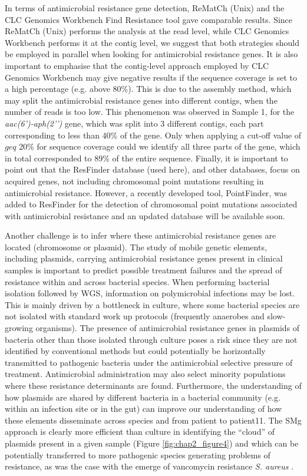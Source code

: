 In terms of antimicrobial resistance gene detection, ReMatCh (Unix) and the CLC Genomics Workbench Find Resistance tool gave comparable results. Since ReMatCh (Unix) performs the analysis at the read level, while CLC Genomics Workbench performs it at the contig level, we suggest that both strategies should be employed in parallel when looking for antimicrobial resistance genes. It is also important to emphasise that the contig-level approach employed by CLC Genomics Workbench may give negative results if the sequence coverage is set to a high percentage (e.g. above 80\%). This is due to the assembly method, which may split the antimicrobial resistance genes into different contigs, when the number of reads is too low. This phenomenon was observed in Sample 1, for the \textit{aac(6’)-aph(2’’)} gene, which was split into 3 different contigs, each part corresponding to less than 40\% of the gene. Only when applying a cut-off value of $geq$ 20\% for sequence coverage could we identify all three parts of the gene, which in total corresponded to 89\% of the entire sequence. Finally, it is important to point out that the ResFinder database (used here), and other databases, focus on acquired genes, not including chromosomal point mutations resulting in antimicrobial resistance. However, a recently developed tool, PointFinder, was added to ResFinder for the detection of chromosomal point mutations associated with antimicrobial resistance \citep{zankari_pointfinder_2017} and an updated database will be available soon.

Another challenge is to infer where these antimicrobial resistance genes are located (chromosome or plasmid). The study of mobile genetic elements, including plasmids, carrying antimicrobial resistance genes present in clinical samples is important to predict possible treatment failures and the spread of resistance within and across bacterial species. When performing bacterial isolation followed by \ac{WGS}, information on polymicrobial infections may be lost. This is mainly driven by a bottleneck in culture, where some bacterial species are not isolated with standard work up protocols (frequently anaerobes and slow-growing organisms). The presence of antimicrobial resistance genes in plasmids of bacteria other than those isolated through culture poses a risk since they are not identified by conventional methods but could potentially be horizontally transmitted to pathogenic bacteria under the antimicrobial selective pressure of treatment. Antimicrobial administration may also select minority populations where these resistance determinants are found. Furthermore, the understanding of how plasmids are shared by different bacteria in a bacterial community (e.g. within an infection site or in the gut) can improve our understanding of how these elements disseminate across species and from patient to patient11. The \ac{SMg} approach is clearly more efficient than culture in identifying the “cloud” of plasmids present in a given sample (Figure \ref{fig:chap2_figure4}) and which can be potentially transferred to more pathogenic species generating problems of resistance, as was the case with the emerge of vancomycin resistance \textit{S. aureus} \citep{melo-cristino_first_2013}.

